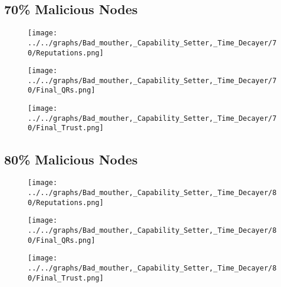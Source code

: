 \begin{minipage}[t]{0.49\columnwidth}
\subsection*{70\% Malicious Nodes}
    \begin{figure}[H]
        \centering
        \texttt{[image: ../../graphs/Bad\_mouther,\_Capability\_Setter,\_Time\_Decayer/70/Reputations.png]}
    \end{figure}
    \begin{figure}[H]
        \centering
        \texttt{[image: ../../graphs/Bad\_mouther,\_Capability\_Setter,\_Time\_Decayer/70/Final\_QRs.png]}
    \end{figure}
\end{minipage}
\begin{minipage}[t]{0.49\columnwidth}
    \begin{figure}[H]
        \centering
        \texttt{[image: ../../graphs/Bad\_mouther,\_Capability\_Setter,\_Time\_Decayer/70/Final\_Trust.png]}
    \end{figure}
\end{minipage}

\begin{minipage}[t]{0.49\columnwidth}
\subsection*{80\% Malicious Nodes}
    \begin{figure}[H]
        \centering
        \texttt{[image: ../../graphs/Bad\_mouther,\_Capability\_Setter,\_Time\_Decayer/80/Reputations.png]}
    \end{figure}
    \begin{figure}[H]
        \centering
        \texttt{[image: ../../graphs/Bad\_mouther,\_Capability\_Setter,\_Time\_Decayer/80/Final\_QRs.png]}
    \end{figure}
\end{minipage}
\begin{minipage}[t]{0.49\columnwidth}
    \begin{figure}[H]
        \centering
        \texttt{[image: ../../graphs/Bad\_mouther,\_Capability\_Setter,\_Time\_Decayer/80/Final\_Trust.png]}
    \end{figure}
\end{minipage}

